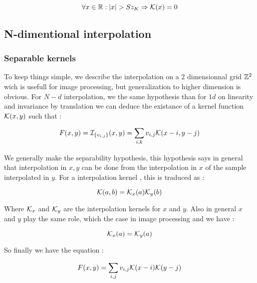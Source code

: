 \begin{equation}
    \forall x \in \mathbb{R}   :  |x| > Sz_K  \Rightarrow \mathcal K(x) = 0 \label{KernIntBounded}
\end{equation}


\subsection{N-dimentional interpolation}

\subsubsection{Separable kernels}

To keep things simple, we describe the interpolation on a $2$ dimensionnal grid $\mathbb{Z}^2$ wich is
usefull for image processing, but generalization to  higher dimension is obvious. For $N-d$
interpolation, we the same hypothesis than for $1d$ on linearity and invariance by translation we
can deduce the existance of a kernel function $\mathcal K(x,y)$ such that :

\begin{equation}
    F(x,y) =  \mathcal I_{\{v_{i,j}\}}(x,y) = \sum_{i,k}  v_{i,j}  \mathcal K(x-i,y-j)   \label{KernInt2DDef}
\end{equation}

We generally make the separability hypothesis, this hypothesis says in general that interpolation
in $x,y$ can be done from the interpolation in $x$ of the sample interpolated in $y$. For a interpolation 
kernel , this is traduced as :

\begin{equation}
     \mathcal K(a,b)  = \mathcal K_x(a) \mathcal K_y(b)  \label{KernIntSep} 
\end{equation}

Where $\mathcal K_x$ and $\mathcal K_y$ are the interpolation kernels for $x$ and $y$. Also in general $x$ and $y$ play
the same role, which the case in image processing and we have :

\begin{equation}
      \mathcal K_x(a) =  \mathcal K_y(a)  \label{KernIntSymSep} 
\end{equation}

So finally we have the equation :

\begin{equation}
    F(x,y) =   \sum_{i,j}  v_{i,j}  \mathcal K(x-i) \mathcal K(y-j)   \label{KernInt2DDef}
\end{equation}

